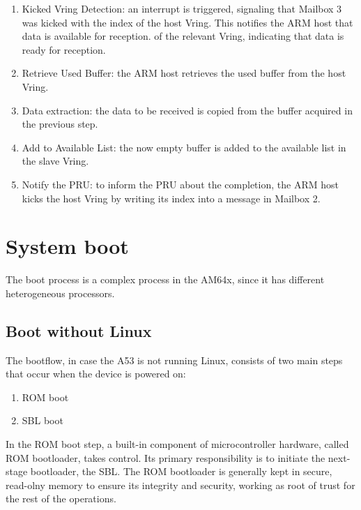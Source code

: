 \begin{enumerate}
    \item   Kicked Vring Detection: an interrupt is triggered, signaling that
            Mailbox 3 was kicked with the index of the host Vring.
            This notifies the ARM host that data is available for reception.
            of the relevant Vring, indicating that data is ready for reception.
    \item   Retrieve Used Buffer: the ARM host retrieves the used buffer
            from the host Vring.
    \item   Data extraction: the data to be received is copied from the buffer
            acquired in the previous step.
    \item   Add to Available List: the now empty buffer is added to the
            available list in the slave Vring.
    \item   Notify the PRU: to inform the PRU about the completion,
            the ARM host kicks the host Vring by writing its index into a
            message in Mailbox 2.
\end{enumerate}

\section{System boot}

The boot process is a complex process in the AM64x, since it has different
heterogeneous processors.

\subsection{Boot without Linux}

The bootflow, in case the A53 is not running Linux, consists of two main steps
that occur when the device is powered on:

\begin{enumerate}
    \item   ROM boot
    \item   SBL boot
\end{enumerate}

In the ROM boot step, a built-in component of microcontroller hardware, called
ROM bootloader, takes control. Its primary responsibility is to initiate the
next-stage bootloader, the SBL.
The ROM bootloader is generally kept in secure, read-olny memory to ensure its
integrity and security, working as root of trust for the rest of the operations.

